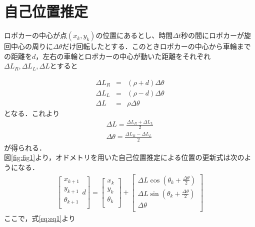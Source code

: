\documentclass[11pt,a4paper]{jsarticle}
\begin{document}
\section{自己位置推定}
ロボカーの中心が点$(x_k,y_k)$の位置にあるとし、時間$\Delta t$秒の間にロボカーが旋回中心の周りに$\Delta \theta$だけ回転したとする．このときロボカーの中心から車輪までの距離を$d$，左右の車輪とロボカーの中心が動いた距離をそれぞれ$\Delta L_R, \Delta L_L, \Delta L$とすると

\begin{eqnarray}
 \Delta L_R & = & (\rho + d)\Delta \theta \nonumber \\ 
 \Delta L_L & = & (\rho - d)\Delta \theta \nonumber \\
 \Delta L & = &\rho \Delta \theta
\end{eqnarray}
となる．これより
\begin{eqnarray}
 \Delta L = \frac{\Delta L_R + \Delta L_L}{2} \nonumber \\
 \Delta \theta = \frac{\Delta L_R - \Delta L_L}{2}
  \label{eq:eq1}
\end{eqnarray}
が得られる．\\
図\ref{fig:fig1}より，オドメトリを用いた自己位置推定による位置の更新式は次のようになる．
\begin{eqnarray}
\left[
\begin{array}{c}
   x_{k+1} \\
 y_{k+1} \\ 
 \theta_{k+1} \\
\end{array}d
 \right]
 = \left[
\begin{array}{c}
 x_k \\ 
y_k \\
 \theta_k \\
\end{array}
\right]
+ \left[
\begin{array}{c}
 \Delta L \cos(\theta_k + \frac{\Delta \theta}{2}) \\
 \Delta L \sin(\theta_k + \frac{\Delta \theta}{2}) \\
 \Delta \theta\\
\end{array}
\right]
 \end{eqnarray}
ここで，式\ref{eq:eq1}より
\end{document}
